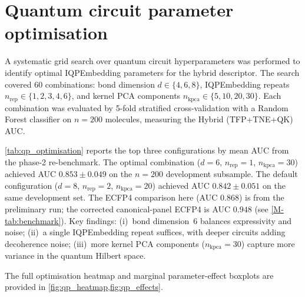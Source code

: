 \documentclass[11pt,a4paper]{article}
\begin{document}

\section{Quantum circuit parameter optimisation}
\label{sec:qp_optimisation}

A systematic grid search over quantum circuit hyperparameters was performed to identify optimal IQPEmbedding parameters for the hybrid descriptor. The search covered \num{60} combinations: bond dimension $d \in \{4, 6, 8\}$, IQPEmbedding repeats $n_{\text{rep}} \in \{1, 2, 3, 4, 6\}$, and kernel PCA components $n_{\text{kpca}} \in \{5, 10, 20, 30\}$. Each combination was evaluated by 5-fold stratified cross-validation with a Random Forest classifier on $n = \num{200}$ molecules, measuring the Hybrid (TFP+TNE+QK) AUC.

\cref{tab:qp_optimisation} reports the top three configurations by mean AUC from the phase-2 re-benchmark. The optimal combination ($d = 6$, $n_{\text{rep}} = 1$, $n_{\text{kpca}} = 30$) achieved AUC $\num{0.853} \pm \num{0.049}$ on the $n=\num{200}$ development subsample. The default configuration ($d = 8$, $n_{\text{rep}} = 2$, $n_{\text{kpca}} = 20$) achieved AUC $\num{0.842} \pm \num{0.051}$ on the same development set. The ECFP4 comparison here (AUC $\num{0.868}$) is from the preliminary run; the corrected canonical-panel ECFP4 is AUC $\num{0.948}$ (see \cref{M-tab:benchmark}). Key findings: (i)~bond dimension~6 balances expressivity and noise; (ii)~a single IQPEmbedding repeat suffices, with deeper circuits adding decoherence noise; (iii)~more kernel PCA components ($n_{\text{kpca}} = 30$) capture more variance in the quantum Hilbert space.

The full optimisation heatmap and marginal parameter-effect boxplots are provided in \cref{fig:qp_heatmap,fig:qp_effects}.
\end{document}
